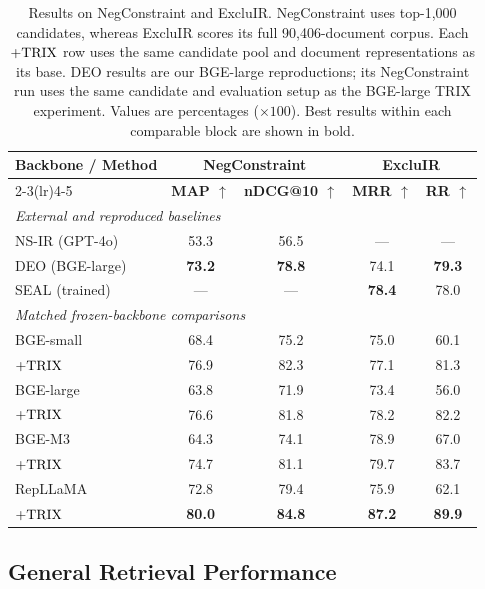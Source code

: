 \documentclass[letterpaper]{article}
\newcommand{\method}{\ifmmode \mathrm{TRIX}\else TRIX\xspace\fi}
\begin{document}
\begin{table}[t]
\centering
\small
\setlength{\tabcolsep}{3.2pt}
\begin{tabular}{@{}lcccc@{}}
\toprule
\multirow{2}{*}{\textbf{Backbone / Method}} &
\multicolumn{2}{c}{\textbf{NegConstraint}} &
\multicolumn{2}{c}{\textbf{ExcluIR}} \\
\cmidrule(lr){2-3}\cmidrule(lr){4-5}
& \textbf{MAP $\uparrow$} & \textbf{nDCG@10 $\uparrow$} & \textbf{MRR $\uparrow$} & \textbf{RR $\uparrow$} \\
\midrule
\multicolumn{5}{l}{\emph{External and reproduced baselines}} \\
NS-IR (GPT-4o) & 53.3 & 56.5 & --- & --- \\
DEO (BGE-large) & \textbf{73.2} & \textbf{78.8} & 74.1 & \textbf{79.3} \\
SEAL (trained) & --- & --- & \textbf{78.4} & 78.0 \\
\midrule
\multicolumn{5}{l}{\emph{Matched frozen-backbone comparisons}} \\
BGE-small & 68.4 & 75.2 &
75.0 & 60.1 \\
\quad $+\method$ & 76.9 & 82.3 &
77.1 & 81.3 \\
\addlinespace[2pt]
BGE-large & 63.8 & 71.9 &
73.4 & 56.0 \\
\quad $+\method$ & 76.6 & 81.8 &
78.2 & 82.2 \\
\addlinespace[2pt]
BGE-M3 & 64.3 & 74.1 &
78.9 & 67.0 \\
\quad $+\method$ & 74.7 & 81.1 &
79.7 & 83.7 \\
\addlinespace[2pt]
RepLLaMA & 72.8 & 79.4 &
75.9 & 62.1 \\
\quad $+\method$ & \textbf{80.0} & \textbf{84.8} &
\textbf{87.2} & \textbf{89.9} \\
\bottomrule
\end{tabular}
\caption{Results on NegConstraint and ExcluIR.  NegConstraint uses top-1,000
candidates, whereas ExcluIR scores its full 90,406-document corpus.  Each
$+\method$ row uses the same candidate pool and document representations as
its base.  DEO results are our BGE-large reproductions; its NegConstraint run
uses the same candidate and evaluation setup as the BGE-large \method{}
experiment.  Values are percentages ($\times100$).  Best results within each
comparable block are shown in bold.}
\label{tab:exclusion-transfer}
\end{table}

\subsection{General Retrieval Performance}
\label{sec:beir-preservation}
\end{document}
